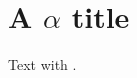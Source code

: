 \documentclass{article}
\begin{document}
\section{A $\alpha$ title}
Text with \texorpdfstring{}{}.
\end{document}
